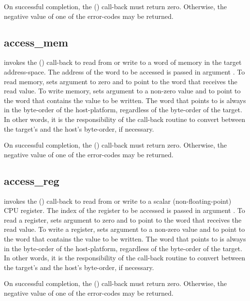 \documentclass{article}
\begin{document}
On successful completion, the ()
call-back must return zero.  Otherwise, the negative value of one of
the  error-codes may be returned.

\subsection{access\_mem}

 invokes the () call-back to read
from or write to a word of memory in the target address-space.  The
address of the word to be accessed is passed in argument .
To read memory,  sets argument  to zero and
 to point to the word that receives the read value.  To
write memory,  sets argument  to a non-zero
value and  to point to the word that contains the value to
be written.  The word that  points to is always in the
byte-order of the host-platform, regardless of the byte-order of the
target.  In other words, it is the responsibility of the call-back
routine to convert between the target's and the host's byte-order, if
necessary.

On successful completion, the ()
call-back must return zero.  Otherwise, the negative value of one of
the  error-codes may be returned.

\subsection{access\_reg}

 invokes the () call-back to read
from or write to a scalar (non-floating-point) CPU register.  The
index of the register to be accessed is passed in argument
.  To read a register,  sets argument
 to zero and  to point to the word that receives
the read value.  To write a register,  sets argument
 to a non-zero value and  to point to the word
that contains the value to be written.  The word that 
points to is always in the byte-order of the host-platform, regardless
of the byte-order of the target.  In other words, it is the
responsibility of the call-back routine to convert between the
target's and the host's byte-order, if necessary.

On successful completion, the () call-back must
return zero.  Otherwise, the negative value of one of the
 error-codes may be returned.
\end{document}
